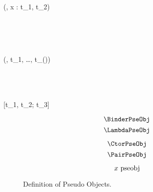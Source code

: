 
\Rule{\BinderPseObj}
    {
         \\
         \\
    }
    {(\kappa, x : t_1, t_2) \pseobj}
    {}

\Rule{\LambdaPseObj}
    {
         \\
         \\
    }
    { \pseobj}
    {}

\Rule{\CtorPseObj}
    {
         \\
    }
    {(\kappa, t_1, \ldots, t_{(\kappa)}) \pseobj}
    {}

\Rule{\PairPseObj}
    {
         \\
         \\
         \\
    }
    {[t_1, t_2; t_3] \pseobj}
    {}

\begin{figure}
    \centering
    \begin{minipage}{0.5\textwidth}
        $$\BinderPseObj$$
        $$\LambdaPseObj$$
    \end{minipage}%
    \begin{minipage}{0.5\textwidth}
        $$\CtorPseObj$$
        $$\PairPseObj$$
    \end{minipage}%
    $$x ~\mbox{\normalfont pseobj}$$
    \caption{Definition of Pseudo Objects.}
\end{figure}
